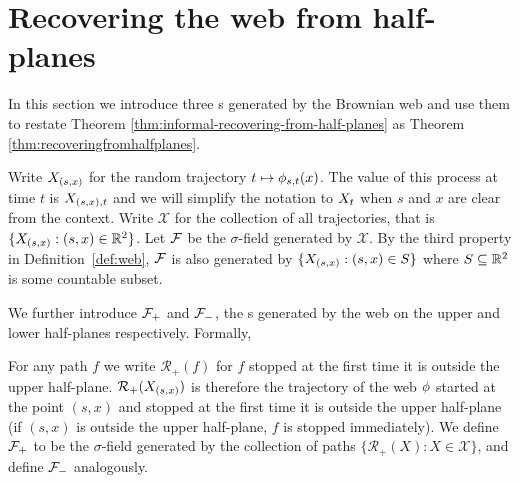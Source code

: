 \newcommand{\indepbm}{\psi}
\newcommand{\toinP}{\overset{\P}\to}
\newcommand{\statementoflemresampledetosampled}{$\resamplede \toinP \sampled$ as $\epsilon \to 0$}

\newcommand{\statewebO}{S_{\webnoargs}}
\newcommand{\statenowebO}{S_{\indepbm}}
\newcommand{\trajs}{\mathcal{X}}
\newcommand{\tensorcondition}{$\sigma$-fields $\F_a$, $\F_b$, $\F_c$
  we write $\F_a = \F_b \tensor \F_c$ when $\F_a$ is generated by
  $\F_b$ and $\F_c$ (up to sets of measure $0$), and $\F_b$ and $\F_c$
  are independent}
{
\section{Recovering the web from half-planes}
\label{sec:recovering-from-half-planes}

In this section we introduce three \sigfield{}s generated by the
Brownian web and use
them to restate Theorem \ref{thm:informal-recovering-from-half-planes}
as Theorem \ref{thm:recoveringfromhalfplanes}.

\newcommand{\restrictupper}{\mathcal{R}_{+}}
\newcommand{\sampledstart}[2]{\sampled_{(#1,#2)}}
\newcommand{\sampledstartt}[3]{\sampled_{({#1},{#2}),{#3}}}

  Write $\sampledstart{s}{x}$ for the random trajectory $t \mapsto
  \phi_{{s},{t}}(x)$.  The value of this process at time $t$ is
  $\sampledstartt{s}{x}{t}$ and we will simplify the notation to
  $X_t$ when $s$ and $x$ are clear from the context.  Write
  $\trajs$ for the collection of all trajectories, that is
  $\{\sampledstart{s}{x} : (s,x) \in \R^2\}$.  Let $\mathcal{F}$ be
  the $\sigma$-field generated by $\trajs$.  By the third property in
  Definition~\ref{def:web}, $\mathcal{F}$ is also generated by
  $\{\sampledstart{s}{x} : (s,x) \in S\}$ where $S \subseteq \mathbb{R}^2$ is
  some countable subset.

  We further introduce $\mathcal{F}_{+}$ and $\mathcal{F}_{-}$, the \sigfield{}s
  generated by the web on the upper and lower half-planes
  respectively.  Formally,

  \begin{definition*}
  For any path $f$ we write $\restrictupper(f)$ for $f$ stopped at the
  first time it is outside the upper half-plane.
  $\restrictupper(\sampledstart{s}{x})$ is therefore the trajectory of the
  web $\phi$ started at the point $(s,x)$ and stopped at the first
  time it is outside the upper half-plane (if $(s,x)$ is outside the
  upper half-plane, $f$ is stopped immediately).
  We define $\mathcal{F}_{+}$ to be the $\sigma$-field generated by the
  collection of paths $\{\restrictupper(X) : X \in \trajs \}$, and define $\mathcal{F}_{-}$ analogously.
  \end{definition*}

}
